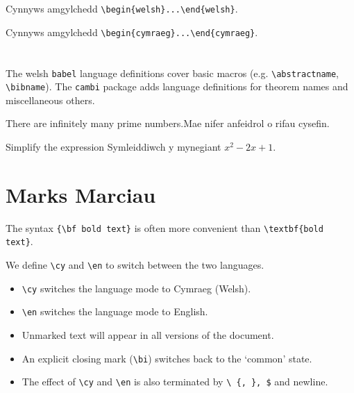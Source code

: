 \documentclass{article}
\begin{document}
\begin{welsh}
Cynnyws amgylchedd \verb+\begin{welsh}...\end{welsh}+.
\end{welsh}

\begin{cymraeg}
Cynnyws amgylchedd \verb+\begin{cymraeg}...\end{cymraeg}+.
\end{cymraeg}

\section{}
The welsh {\tt babel} language definitions cover basic macros (e.g. \verb+\abstractname+, \verb+\bibname+). The \verb+cambi+ package adds language definitions for theorem names and miscellaneous others.

\begin{theorem}
{\en There are infinitely many prime numbers.\cy Mae nifer anfeidrol o rifau cysefin.}
\end{theorem}	

\begin{exercise}
\en Simplify the expression \cy Symleiddiwch y mynegiant $x^2-2x+1$.
\end{exercise}	


\section{\en Marks \cy Marciau}

The syntax \verb+{\bf bold text}+ is often more convenient than \verb+\textbf{bold text}+. 

We define \verb+\cy+ and \verb+\en+ to switch between the two languages.

\begin{itemize}
\item \verb+\cy+ switches the language mode to Cymraeg (Welsh).
\item \verb+\en+ switches the language mode to English.
\item Unmarked text will appear in all versions of the document. 
\item An explicit closing mark (\verb+\bi+) switches back to the `common' state.
\item The effect of \verb+\cy+ and \verb+\en+ is also terminated by \verb+\ {, }, $+ and newline. 
\end{itemize}
\end{document}
